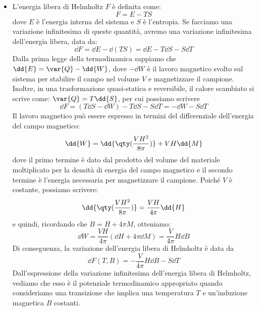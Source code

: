 \begin{itemize}[leftmargin=0.5cm]
   \item L'energia libera di Helmholtz $F$ è definita come:
   \begin{equation*}
      F=E - TS
   \end{equation*}
   dove $E$ è l'energia interna del sistema e $S$ è l'entropia. Se facciamo una variazione infinitesima di queste quantità, avremo una variazione infinitesima dell'energia libera, data da:
   \begin{equation*}
      \dd{F}
      =\dd{E} - \dd{(TS)}
      =\dd{E} - T\dd{S} - S\dd{T}
   \end{equation*}
   Dalla prima legge della termodinamica sappiamo che $\dd{E}=\var{Q} - \dd{W}$, dove $-\dd{W}$ è il lavoro magnetico svolto sul sistema per stabilire il campo nel volume $V$ e magnetizzare il campione. Inoltre, in una trasformazione quasi-statica e reversibile, il calore scambiato si scrive come: $\var{Q}=T\dd{S}$, per cui possiamo scrivere
   \begin{equation*}
      \dd{F}
      =( T\dd{S} - \dd{W} ) - T\dd{S} - S\dd{T}
      =- \dd{W} - S\dd{T}
   \end{equation*}
   Il lavoro magnetico può essere espresso in termini del differenziale dell'energia del campo magnetico:
\begin{equation*}
   \dd{W}
   =\dd{ \qty( \frac{V H^2}{8\pi} ) } + V H \dd{M}
\end{equation*}
dove il primo termine è dato dal prodotto del volume del materiale moltiplicato per la densità di energia del campo magnetico e il secondo termine è l'energia necessaria per magnetizzare il campione. Poiché $V$ è costante, possiamo scrivere:
\begin{equation*}
   \dd{ \qty( \frac{V H^2}{8\pi} ) }
   =\frac{V H}{4\pi} \dd{H}
\end{equation*}
e quindi, ricordando che $B=H + 4\pi M$, otteniamo:
\begin{equation*}
   \dd{W}
   =\frac{V H}{4\pi} ( \dd{H} + 4\pi \dd{M} )
   =\frac{V}{4\pi} H \dd{B}
\end{equation*}
Di conseguenza, la variazione dell'energia libera di Helmholtz è data da
\begin{equation*}
   \dd{F(T,B)}
   =- \frac{V}{4\pi} H \dd{B} - S \dd{T}
\end{equation*}
Dall'espressione della variazione infinitesima dell'energia libera di Helmholtz, vediamo che esso è il potenziale termodinamico appropriato quando consideriamo una transizione che implica una temperatura $T$ e un'induzione magnetica $B$ costanti.

\end{itemize}
